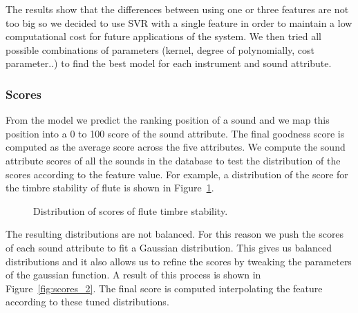 \documentclass{article}
\begin{document}
The results show that the differences between using one or three features are not too big so we decided to use SVR with a single feature  in order to maintain a low computational cost for future applications of the system. We then tried all possible combinations of parameters (kernel, degree of polynomially, cost parameter..) to find the best model for each instrument and sound attribute.

\subsubsection{Scores}
From the model we predict the ranking position of a sound and we map this position into a 0 to 100 score of the sound attribute. The final goodness score is computed as the average score across the five attributes. We compute the sound attribute scores of all the sounds in the database to test the distribution of the scores according to the feature value. For example, a distribution of the score for the timbre stability of flute is shown in Figure~\ref{fig:scores}.

\begin{figure}[ht]
 \centerline{}
 \caption{Distribution of scores of flute timbre stability.}
 \label{fig:scores}
\end{figure}

The resulting distributions are not balanced. For this reason we push the scores of each sound attribute to fit a Gaussian distribution. This gives us balanced distributions and it also allows us to refine the scores by tweaking the parameters of the gaussian function. A result of this process is shown in Figure~\ref{fig:scores_2}. The final score is computed interpolating the feature according to these tuned distributions. 
\end{document}
